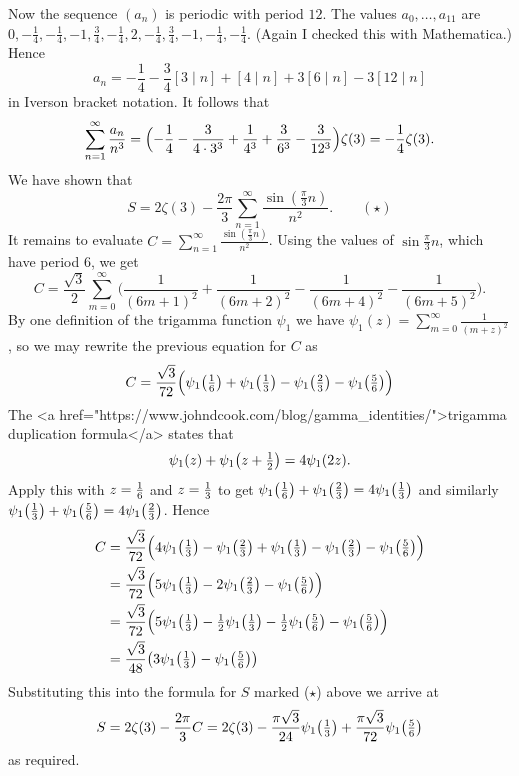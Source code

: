 Now the sequence $(a_n)$ is periodic with period $12$.
The values $a_0,\ldots, a_{11}$ are 
$0,-\frac{1}{4},-\frac{1}{4},-1, \frac{3}{4}, -\frac{1}{4}, 2, -\frac{1}{4}, \frac{3}{4}, -1, -\frac{1}{4},
-\frac{1}{4}$. (Again I checked this with Mathematica.)
Hence
$$
a_n=
-\frac{1}{4}-\frac{3}{4} [3 \mid n] + 
[ 4 \mid n] + 3 [6 \mid n] - 3 [12 \mid n]
$$ 
in Iverson bracket notation.
It follows that 
$$
\sum_{n=1}^\infty \frac{a_n}{n^3} =
\Bigl( -\frac{1}{4} -\frac{3}{4\cdot 3^3} +\frac{1}{4^3} +\frac{3}{6^3} -\frac{3}{12^3}
\Bigr)\zeta(3)
= -\frac{1}{4}\zeta(3).
$$
We have shown that 
$$ S = 2\zeta(3)-\frac{2\pi}{3}\sum_{n=1}^\infty \frac{\sin(\frac{\pi}{3} n)}{n^2}. \qquad(\star) $$
It remains to evaluate 
$ C=\sum_{n=1}^\infty \frac{\sin(\frac{\pi}{3}n)}{n^2}$.
Using the values of $\sin \frac{\pi}{3}n$, which have period $6$, we get
$$
C = \frac{\sqrt{3}}{2}\sum_{m=0}^\infty
\bigl( \frac{1}{(6m+1)^2} +\frac{1}{(6m+2)^2} -\frac{1}{(6m+4)^2} -\frac{1}{(6m+5)^2} \bigr). $$
By one definition of the trigamma function $\psi_1$ we have
$\psi_1(z)=\sum_{m=0}^\infty \frac1{(m+z)^2}$,
so we may rewrite the previous equation for $C$ as
$$
C = \frac{\sqrt{3}}{72}
\Bigl(  \psi_1\bigl({\textstyle\frac{1}{6}} \bigr)  + \psi_1\bigl({\textstyle\frac{1}{3}} \bigr)  - \psi_1\bigl({\textstyle\frac{2}{3}} \bigr) 
-\psi_1\bigl({\textstyle\frac{5}{6}} \bigr)  \Bigr) $$
The <a href="https://www.johndcook.com/blog/gamma_identities/">trigamma duplication formula</a> states that
$$
\psi_1(z)+\psi_1\!\left(z+ {\textstyle\frac{1}{2}} \right)=4\psi_1(2z). $$
Apply this with $z={\textstyle\frac{1}{6}}$ and $z = {\textstyle\frac{1}{3}}$ to get
$ \psi_1\bigl( {\textstyle\frac{1}{6}} \bigr) + \psi_1 \bigl( {\textstyle\frac{2}{3}} \bigr) = 4 \psi_1 \bigl( {\textstyle\frac{1}{3}} \bigr)$
and similarly
$ \psi_1\bigl( {\textstyle\frac{1}{3}} \bigr) + \psi_1 \bigl( {\textstyle\frac{5}{6}} \bigr) = 4 \psi_1 \bigl( {\textstyle\frac{2}{3}} \bigr)$.
Hence
$$ \begin{aligned} C &=
\frac{\sqrt{3}}{72}
\Bigl( 4 \psi_1\bigl( {\textstyle\frac{1}{3}} \bigr) - \psi_1 \bigl( {\textstyle\frac{2}{3}} \bigr) 
+ \psi_1\bigl({\textstyle\frac{1}{3}} \bigr)  - \psi_1\bigl({\textstyle\frac{2}{3}} \bigr) 
-\psi_1\bigl({\textstyle\frac{5}{6}} \bigr) \Bigr) \\
&=
\frac{\sqrt{3}}{72}
\Bigl( 
5\psi_1\bigl({\textstyle\frac{1}{3}} \bigr) -2\psi_1\bigl({\textstyle\frac{2}{3}} \bigr) -\psi_1\bigl( {\textstyle\frac{5}{6}} \bigr) \Bigr) 
\\ &=
\frac{\sqrt{3}}{72}
\Bigl( 
5\psi_1\bigl( {\textstyle\frac{1}{3}} \bigr) - {\textstyle\frac{1}{2}} \psi_1 \bigl( {\textstyle\frac{1}{3}} \bigr) 
- {\textstyle\frac{1}{2}} \psi_1 \bigl( {\textstyle\frac{5}{6}} \bigr) - \psi_1 \bigl( {\textstyle\frac{5}{6}} \bigr) 
\Bigr) \\
&=
\frac{\sqrt3}{48}
\bigl( 
3\psi_1\bigl( {\textstyle\frac{1}{3}} \bigr) - \psi_1 \bigl( {\textstyle\frac{5}{6}} \bigr) \bigr)
\end{aligned}
$$
Substituting this into the formula for $S$ marked ($\star$) above we arrive at
$$ S =
2\zeta(3) -\frac{2\pi}{3}C = 2\zeta(3)
-\frac{\pi\sqrt{3}}{24}\psi_1\bigl({\textstyle\frac{1}{3}} \bigr) 
+\frac{\pi\sqrt{3}}{72}\psi_1\bigl( {\textstyle\frac{5}{6}} \bigr)
$$
as required.
